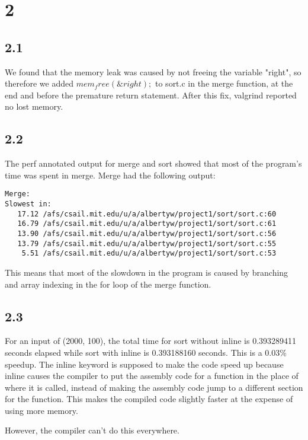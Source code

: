 \documentclass[12pt]{article}
\begin{document}
\maketitle
\section{2}
\subsection{2.1}
We found that the memory leak was caused by not freeing the variable "right", 
so therefore we added $mem_free(\&right);$ to sort.c in the merge function, at 
the end and before the premature return statement.  After this fix, valgrind 
reported no lost memory.  

\subsection{2.2}
The perf annotated output for merge and sort showed that most of the program's 
time was spent in merge.  Merge had the following output:
\begin{verbatim}
Merge:
Slowest in:
   17.12 /afs/csail.mit.edu/u/a/albertyw/project1/sort/sort.c:60
   16.79 /afs/csail.mit.edu/u/a/albertyw/project1/sort/sort.c:61
   13.90 /afs/csail.mit.edu/u/a/albertyw/project1/sort/sort.c:56
   13.79 /afs/csail.mit.edu/u/a/albertyw/project1/sort/sort.c:55
    5.51 /afs/csail.mit.edu/u/a/albertyw/project1/sort/sort.c:53
\end{verbatim}
This means that most of the slowdown in the program is caused by branching and 
array indexing in the for loop of the merge function.  

\subsection{2.3}
For an input of (2000, 100), the total time for sort without inline is 0.393289411 seconds elapsed while 
sort with inline is 0.393188160 seconds.  This is a 0.03\% speedup.  
The inline keyword is supposed to make the code speed up because inline 
causes the compiler to put the assembly code for a function in the place of 
where it is called, instead of making the assembly code jump to a different 
section for the function.  This makes the compiled code slightly faster at the 
expense of using more memory.  

However, the compiler can't do this everywhere.  
\end{document}
